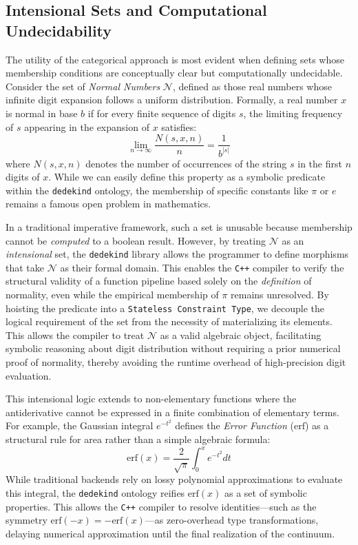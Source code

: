 \documentclass[11pt, a4paper]{report}
\begin{document}
\subsection{Intensional Sets and Computational Undecidability}
The utility of the categorical approach is most evident when defining sets whose membership conditions are conceptually clear but computationally undecidable.
Consider the set of \emph{Normal Numbers} $\mathscr N$, defined as those real numbers whose infinite digit expansion follows a uniform distribution.
Formally, a real number $x$ is normal in base $b$ if for every finite sequence of digits $s$, the limiting frequency of $s$ appearing in the expansion of $x$ satisfies:
\begin{equation}
\lim_{n \to \infty} \frac{N(s, x, n)}{n} = \frac{1}{b^{|s|}}
\end{equation}
where $N(s, x, n)$ denotes the number of occurrences of the string $s$ in the first $n$ digits of $x$.
While we can easily define this property as a symbolic predicate within the \texttt{dedekind} ontology, the membership of specific constants like $\pi$ or $e$ remains a famous open problem in mathematics.

In a traditional imperative framework, such a set is unusable because membership cannot be \emph{computed} to a boolean result.
However, by treating $\mathscr{N}$ as an \emph{intensional} set, the \texttt{dedekind} library allows the programmer to define morphisms that take $\mathscr{N}$ as their formal domain.
This enables the \texttt{C++} compiler to verify the structural validity of a function pipeline based solely on the \emph{definition} of normality, even while the empirical membership of $\pi$ remains unresolved.
By hoisting the predicate into a \texttt{Stateless Constraint Type}, we decouple the logical requirement of the set from the necessity of materializing its elements.
This allows the compiler to treat $\mathscr{N}$ as a valid algebraic object, facilitating symbolic reasoning about digit distribution without requiring a prior numerical proof of normality, thereby avoiding the runtime overhead of high-precision digit evaluation.

This intensional logic extends to non-elementary functions where the antiderivative cannot be expressed in a finite combination of elementary terms.
For example, the Gaussian integral $e^{-t^2}$ defines the \emph{Error Function} ($\text{erf}$) as a structural rule for area rather than a simple algebraic formula:
\begin{equation}
\text{erf}(x) = \frac{2}{\sqrt{\pi}} \int_{0}^{x} e^{-t^2} dt
\end{equation}
While traditional backends rely on lossy polynomial approximations to evaluate this integral, the \texttt{dedekind} ontology reifies $\text{erf}(x)$ as a set of symbolic properties.
This allows the \texttt{C++} compiler to resolve identities—such as the symmetry $\text{erf}(-x) = -\text{erf}(x)$—as zero-overhead type transformations, delaying numerical approximation until the final realization of the continuum.
\end{document}

